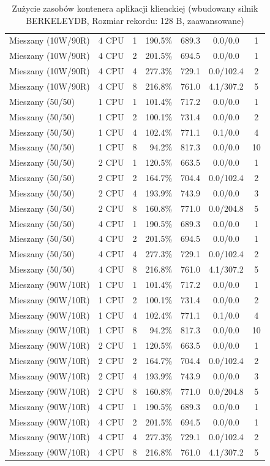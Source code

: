 \begin{table}[ht]
{\begin{tabular}{llcrrcc}
Mieszany (10W/90R) & 4 CPU & 1 & 190.5\% & 689.3 & 0.0/0.0 & 1 \\
Mieszany (10W/90R) & 4 CPU & 2 & 201.5\% & 694.5 & 0.0/0.0 & 1 \\
Mieszany (10W/90R) & 4 CPU & 4 & 277.3\% & 729.1 & 0.0/102.4 & 2 \\
Mieszany (10W/90R) & 4 CPU & 8 & 216.8\% & 761.0 & 4.1/307.2 & 5 \\
Mieszany (50/50) & 1 CPU & 1 & 101.4\% & 717.2 & 0.0/0.0 & 1 \\
Mieszany (50/50) & 1 CPU & 2 & 100.1\% & 731.4 & 0.0/0.0 & 2 \\
Mieszany (50/50) & 1 CPU & 4 & 102.4\% & 771.1 & 0.1/0.0 & 4 \\
Mieszany (50/50) & 1 CPU & 8 & 94.2\% & 817.3 & 0.0/0.0 & 10 \\
Mieszany (50/50) & 2 CPU & 1 & 120.5\% & 663.5 & 0.0/0.0 & 1 \\
Mieszany (50/50) & 2 CPU & 2 & 164.7\% & 704.4 & 0.0/102.4 & 2 \\
Mieszany (50/50) & 2 CPU & 4 & 193.9\% & 743.9 & 0.0/0.0 & 3 \\
Mieszany (50/50) & 2 CPU & 8 & 160.8\% & 771.0 & 0.0/204.8 & 5 \\
Mieszany (50/50) & 4 CPU & 1 & 190.5\% & 689.3 & 0.0/0.0 & 1 \\
Mieszany (50/50) & 4 CPU & 2 & 201.5\% & 694.5 & 0.0/0.0 & 1 \\
Mieszany (50/50) & 4 CPU & 4 & 277.3\% & 729.1 & 0.0/102.4 & 2 \\
Mieszany (50/50) & 4 CPU & 8 & 216.8\% & 761.0 & 4.1/307.2 & 5 \\
Mieszany (90W/10R) & 1 CPU & 1 & 101.4\% & 717.2 & 0.0/0.0 & 1 \\
Mieszany (90W/10R) & 1 CPU & 2 & 100.1\% & 731.4 & 0.0/0.0 & 2 \\
Mieszany (90W/10R) & 1 CPU & 4 & 102.4\% & 771.1 & 0.1/0.0 & 4 \\
Mieszany (90W/10R) & 1 CPU & 8 & 94.2\% & 817.3 & 0.0/0.0 & 10 \\
Mieszany (90W/10R) & 2 CPU & 1 & 120.5\% & 663.5 & 0.0/0.0 & 1 \\
Mieszany (90W/10R) & 2 CPU & 2 & 164.7\% & 704.4 & 0.0/102.4 & 2 \\
Mieszany (90W/10R) & 2 CPU & 4 & 193.9\% & 743.9 & 0.0/0.0 & 3 \\
Mieszany (90W/10R) & 2 CPU & 8 & 160.8\% & 771.0 & 0.0/204.8 & 5 \\
Mieszany (90W/10R) & 4 CPU & 1 & 190.5\% & 689.3 & 0.0/0.0 & 1 \\
Mieszany (90W/10R) & 4 CPU & 2 & 201.5\% & 694.5 & 0.0/0.0 & 1 \\
Mieszany (90W/10R) & 4 CPU & 4 & 277.3\% & 729.1 & 0.0/102.4 & 2 \\
Mieszany (90W/10R) & 4 CPU & 8 & 216.8\% & 761.0 & 4.1/307.2 & 5 \\
\bottomrule
\end{tabular}%
}
\caption{Zużycie zasobów kontenera aplikacji klienckiej (wbudowany silnik BERKELEYDB, Rozmiar rekordu: 128 B, zaawansowane)}
\label{tab:resources_berkeleydb_small_0}
\end{table}

